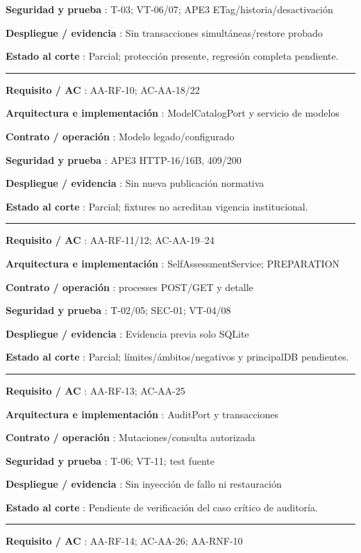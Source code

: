 \documentclass[12pt,a4paper]{report}
\begin{document}
\textbf{Seguridad y prueba }: T-03; VT-06/07; APE3
ETag/historia/desactivación

\textbf{Despliegue / evidencia }: Sin transacciones simultáneas/restore
probado

\textbf{Estado al corte }: Parcial; protección presente, regresión
completa pendiente.

\medskip\hrule\medskip

\textbf{Requisito / AC }: AA-RF-10; AC-AA-18/22

\textbf{Arquitectura e implementación }: ModelCatalogPort y servicio de
modelos

\textbf{Contrato / operación }: Modelo legado/configurado

\textbf{Seguridad y prueba }: APE3 HTTP-16/16B, 409/200

\textbf{Despliegue / evidencia }: Sin nueva publicación normativa

\textbf{Estado al corte }: Parcial; fixtures no acreditan vigencia
institucional.

\medskip\hrule\medskip

\textbf{Requisito / AC }: AA-RF-11/12; AC-AA-19--24

\textbf{Arquitectura e implementación }: SelfAssessmentService;
PREPARATION

\textbf{Contrato / operación }: processes POST/GET y detalle

\textbf{Seguridad y prueba }: T-02/05; SEC-01; VT-04/08

\textbf{Despliegue / evidencia }: Evidencia previa solo SQLite

\textbf{Estado al corte }: Parcial; límites/ámbitos/negativos y
principalDB pendientes.

\medskip\hrule\medskip

\textbf{Requisito / AC }: AA-RF-13; AC-AA-25

\textbf{Arquitectura e implementación }: AuditPort y transacciones

\textbf{Contrato / operación }: Mutaciones/consulta autorizada

\textbf{Seguridad y prueba }: T-06; VT-11; test fuente

\textbf{Despliegue / evidencia }: Sin inyección de fallo ni restauración

\textbf{Estado al corte }: Pendiente de verificación del caso crítico de
auditoría.

\medskip\hrule\medskip

\textbf{Requisito / AC }: AA-RF-14; AC-AA-26; AA-RNF-10
\end{document}
